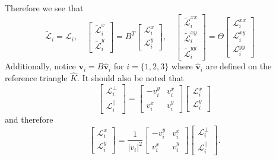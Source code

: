Therefore we see that 
\begin{equation*}
  \tilde{\mathcal{L}}_i = \mathcal{L}_i, \quad 
  \begin{bmatrix}
    \tilde{\mathcal{L}}^x_i \\ \tilde{\mathcal{L}}^y_i 
  \end{bmatrix} = B^T \begin{bmatrix} 
    \mathcal{L}^x_i \\ \mathcal{L}^y_i 
  \end{bmatrix}, \quad
  \begin{bmatrix}
    \tilde{\mathcal{L}}^{xx}_i \\ \tilde{\mathcal{L}}^{xy}_i \\ \tilde{\mathcal{L}}^{yy}_i 
  \end{bmatrix} = \Theta \begin{bmatrix} 
    \mathcal{L}^{xx}_i \\ \mathcal{L}^{xy}_i \\ \mathcal{L}^{yy}_i  
  \end{bmatrix} \quad
\end{equation*}
Additionally, notice $\mathbf{v}_i = B\hat{\mathbf{v}}_i$ for
$i=\{1,2,3\}$ where $\hat{\mathbf{v}}_i$ are defined on the reference triangle
$\hat{K}$. It should also be noted that 
\begin{equation*}
  \begin{bmatrix}
    \mathcal{L}^{\perp}_i \\ \mathcal{L}^{||}_i
  \end{bmatrix} = \begin{bmatrix} -v^y_i & v^x_i \\ v^x_i & v^y_i \end{bmatrix}
  \begin{bmatrix}
    \mathcal{L}^x_i \\ \mathcal{L}^y_i
  \end{bmatrix}
\end{equation*}
and therefore 
\begin{equation*}
  \begin{bmatrix}
    \mathcal{L}^{x}_i \\ \mathcal{L}^{y}_i
  \end{bmatrix} = \frac{1}{|v_i|^2} 
  \begin{bmatrix} -v^y_i & v^x_i \\ v^x_i & v^y_i \end{bmatrix}
  \begin{bmatrix}
    \mathcal{L}^{\perp}_i \\ \mathcal{L}^{||}_i
  \end{bmatrix}.
\end{equation*}
